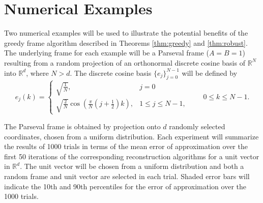 \documentclass[11pt]{amsart}
\newcounter{Theorem}
\numberwithin{Theorem}{section}
\theoremstyle{definition}
\begin{document}
\section{Numerical Examples} \label{section:5}

Two numerical examples will be used to illustrate the potential benefits of the greedy frame algorithm described in Theorems \ref{thm:greedy} and \ref{thm:robust}.  The underlying frame for each example will be a Parseval frame ($A=B=1$) resulting from a random projection of an orthonormal discrete cosine basis of $\mathbb{R}^{N}$ into $\mathbb{R}^{d}$, where $N>d$.  The discrete cosine basis $\lbrace e_{j}\rbrace_{j=0}^{N-1}$ will be defined by
$$ e_{j}(k) = \begin{cases}  \sqrt{\tfrac{1}{N}}, & j=0 \\ \sqrt{\tfrac{2}{N}} \cos{\left ( \tfrac{\pi}{N} (j+\tfrac{1}{2}) k\right )}, & 1\le j\le N-1, \end{cases}  \qquad 0\le k\le N-1. $$

\noindent
The Parseval frame is obtained by projection onto $d$ randomly selected coordinates, chosen from a uniform distribution.  Each experiment will summarize the results of 1000 trials in terms of the mean error of approximation over the first 50 iterations of the corresponding reconstruction algorithms for a unit vector in $\mathbb{R}^{d}$.  The unit vector will be chosen from a uniform distribution and both a random frame and unit vector are selected in each trial.  Shaded error bars will indicate the 10th and 90th percentiles for the error of approximation over the 1000 trials.
\end{document}
